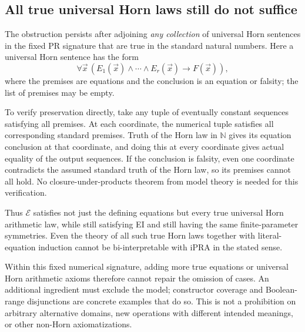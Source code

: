\documentclass[11pt,letterpaper]{article}
\theoremstyle{definition}\newtheorem{definition}[theorem]{Definition}
\theoremstyle{remark}\newtheorem{remark}[theorem]{Remark}
\begin{document}
\subsection{All true universal Horn laws still do not suffice}

The obstruction persists after adjoining \emph{any collection} of
universal Horn sentences in the fixed PR signature that are true in
the standard natural numbers.  Here a universal Horn sentence has
the form
\[
 \forall\vec x\,
   (E_1(\vec x)\land\cdots\land E_r(\vec x)\to F(\vec x)),
\]
where the premises are equations and the conclusion is an equation
or falsity; the list of premises may be empty.

To verify preservation directly, take any tuple of eventually constant
sequences satisfying all premises.  At each coordinate, the numerical
tuple satisfies all corresponding standard premises.  Truth of the
Horn law in $\mathbb N$ gives its equation conclusion at that
coordinate, and doing this at every coordinate gives actual equality
of the output sequences.  If the conclusion is falsity, even one
coordinate contradicts the assumed standard truth of the Horn law,
so its premises cannot all hold.  No closure-under-products theorem
from model theory is needed for this verification.

Thus $\mathcal E$ satisfies not just the defining equations but every
true universal Horn arithmetic law, while still satisfying EI and
still having the same finite-parameter symmetries.  Even the theory
of all such true Horn laws together with literal-equation induction
cannot be bi-interpretable with iPRA in the stated sense.

Within this fixed numerical signature, adding more true equations
or universal Horn arithmetic axioms therefore cannot repair the
omission of cases.  An additional ingredient must exclude the model;
constructor coverage and Boolean-range disjunctions are concrete
examples that do so.  This is not a prohibition on arbitrary alternative
domains, new operations with different intended meanings, or other
non-Horn axiomatizations.
\end{document}
